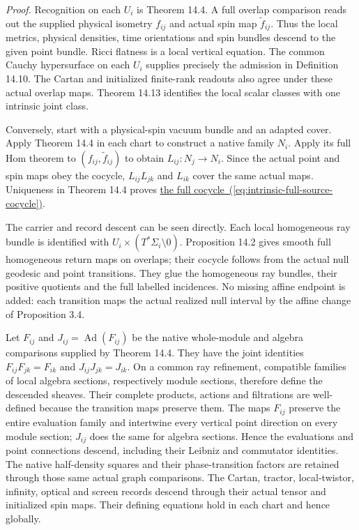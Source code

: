 \documentclass[
  english,
  11pt,
  reqno]{amsart}
\begin{document}
\emph{Proof.} Recognition on each \(U_i\) is Theorem 14.4. A full
overlap comparison reads out the supplied physical isometry \(f_{ij}\)
and actual spin map \(\widetilde f_{ij}\). Thus the local metrics,
physical densities, time orientations and spin bundles descend to the
given point bundle. Ricci flatness is a local vertical equation. The
common Cauchy hypersurface on each \(U_i\) supplies precisely the
admission in Definition 14.10. The Cartan and initialized finite-rank
readouts also agree under these actual overlap maps. Theorem 14.13
identifies the local scalar classes with one intrinsic joint class.

Conversely, start with a physical-spin vacuum bundle and an adapted
cover. Apply Theorem 14.4 in each chart to construct a native family
\(N_i\). Apply its full Hom theorem to \((f_{ij},\widetilde f_{ij})\) to
obtain \(L_{ij}:N_j\to N_i\). Since the actual point and spin maps obey
the cocycle, \(L_{ij}L_{jk}\) and \(L_{ik}\) cover the same actual maps.
Uniqueness in Theorem 14.4 proves
\hyperref[eq:intrinsic-full-source-cocycle]{the full cocycle~(\ref*{eq:intrinsic-full-source-cocycle})}.

The carrier and record descent can be seen directly. Each local
homogeneous ray bundle is identified with
\(U_i\times(T^*\Sigma_i\setminus0)\). Proposition 14.2 gives smooth full
homogeneous return maps on overlaps; their cocycle follows from the
actual null geodesic and point transitions. They glue the homogeneous
ray bundles, their positive quotients and the full labelled incidences.
No missing affine endpoint is added: each transition maps the actual
realized null interval by the affine change of Proposition 3.4.

Let \(F_{ij}\) and \(J_{ij}=\operatorname{Ad}(F_{ij})\) be the native
whole-module and algebra comparisons supplied by Theorem 14.4. They have
the joint identities \(F_{ij}F_{jk}=F_{ik}\) and
\(J_{ij}J_{jk}=J_{ik}\). On a common ray refinement, compatible families
of local algebra sections, respectively module sections, therefore
define the descended sheaves. Their complete products, actions and
filtrations are well-defined because the transition maps preserve them.
The maps \(F_{ij}\) preserve the entire evaluation family and intertwine
every vertical point direction on every module section; \(J_{ij}\) does
the same for algebra sections. Hence the evaluations and point
connections descend, including their Leibniz and commutator identities.
The native half-density squares and their phase-transition factors are
retained through those same actual graph comparisons. The Cartan,
tractor, local-twistor, infinity, optical and screen records descend
through their actual tensor and initialized spin maps. Their defining
equations hold in each chart and hence globally.
\end{document}
